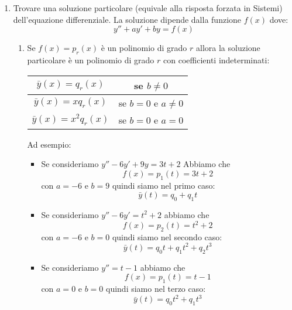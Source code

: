 \documentclass{article}
\begin{document}
\begin{enumerate}
  \item Trovare una soluzione particolare (equivale alla risposta forzata in Sistemi)
    dell'equazione differenziale. La soluzione dipende dalla funzione $f(x)$ dove:
    \[
      y'' + a y' + b y = f(x)
    \] 
    \begin{enumerate}
      \item Se \( f(x) = p_r(x) \) è un polinomio di grado \( r \) allora la soluzione
        particolare è un polinomio di grado \( r \) con coefficienti indeterminati:
        \begin{table}[H]
          \centering
          \begin{tabular}{|c|c|}
            \hline
            \( \bar{y}(x) = q_r(x) \) & se \( b \neq 0 \) \\
            \hline
            \( \bar{y}(x) = xq_{r}(x) \) & se \( b = 0 \) e \( a \neq 0 \) \\
            \hline
            \( \bar{y}(x) = x^2q_{r}(x) \) & se \( b = 0 \) e \( a = 0 \) \\
            \hline
          \end{tabular}
        \end{table}
      \begin{example}
        Ad esempio:
        \begin{itemize}
          \item Se consideriamo \( y'' - 6y' + 9y = 3t + 2 \) 
            Abbiamo che
            \[
              f(x) = p_1(t) = 3t + 2
            \]
            con \( a = -6 \) e \( b = 9 \) 
            quindi siamo nel primo caso:
            \[
              \bar{y}(t) = q_0 + q_1 t
            \] 

          \item Se consideriamo \( y'' - 6y' = t^2+2 \) abbiamo che
            \[
              f(x) = p_2(t) = t^2 + 2
            \] 
            con \( a = -6 \) e \( b = 0 \) quindi siamo nel secondo caso:
            \[
              \bar{y}(t) = q_0 t + q_1 t^2 + q_2 t^3
            \] 

          \item Se consideriamo \( y'' = t-1 \) abbiamo che
            \[
              f(x) = p_1(t) = t-1
            \] 
            con \( a = 0 \) e \( b = 0 \) quindi siamo nel terzo caso:
            \[
              \bar{y}(t) = q_0 t^2 + q_1 t^3
            \]
        \end{itemize}
      \end{example}


\end{enumerate}
\end{enumerate}
\end{document}
